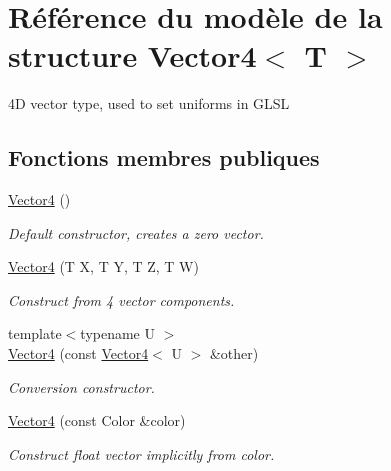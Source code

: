 \hypertarget{structVector4}{}\section{Référence du modèle de la structure Vector4$<$ T $>$}
\label{structVector4}


4D vector type, used to set uniforms in G\+L\+SL  


\subsection*{Fonctions membres publiques}
\begin{DoxyCompactItemize}
\item 
\mbox{\label{structVector4_afdef97d94e5697622b5322637028accf}} 
\hyperlink{structVector4_afdef97d94e5697622b5322637028accf}{Vector4} ()
\begin{DoxyCompactList}\small\item\em Default constructor, creates a zero vector. \end{DoxyCompactList}\item 
\hyperlink{structVector4_ae099ed0a6d7d78ed38ac023d0e4cec25}{Vector4} (T X, T Y, T Z, T W)
\begin{DoxyCompactList}\small\item\em Construct from 4 vector components. \end{DoxyCompactList}\item 
{\footnotesize template$<$typename U $>$ }\\\hyperlink{structVector4_a6413d8b504d7fdfbb600a0caf9c90cc2}{Vector4} (const \hyperlink{structVector4}{Vector4}$<$ U $>$ \&other)
\begin{DoxyCompactList}\small\item\em Conversion constructor. \end{DoxyCompactList}\item 
\hyperlink{structVector4_af1da65a743ddbb5c779b41eae766c00d}{Vector4} (const Color \&color)
\begin{DoxyCompactList}\small\item\em Construct float vector implicitly from color. \end{DoxyCompactList}\end{DoxyCompactItemize}

